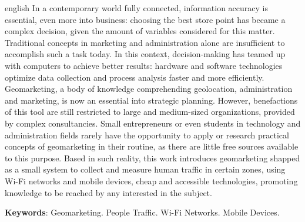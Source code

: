 \documentclass[
		12pt,				%
		openright,			%
		oneside,			%
		a4paper,			%
		chapter=TITLE,		%
		english,			%
		brazil				%
	]{abntex2}
\newif\iffinal
\begin{document}
	\begin{resumo}[Abstract]
	 	\begin{otherlanguage*}{english}
    In a contemporary world fully connected, information accuracy is essential, even more into business: choosing the best store point has became a complex decision, given the amount of variables considered for this matter. Traditional concepts in marketing and administration alone are insufficient to accomplish such a task today. In this context, decision-making has teamed up with computers to achieve better results: hardware and software technologies optimize data collection and process analysis faster and more efficiently. Geomarketing, a body of knowledge comprehending geolocation, administration and marketing, is now an essential into strategic planning. However, benefactions of this tool are still restricted to large and medium-sized organizations, provided by complex consultancies. Small entrepreneurs or even students in  technology and administration fields rarely have the opportunity to apply or research practical concepts of geomarketing in their routine, as there are little free sources available to this purpose. Based in such reality, this work introduces geomarketing shapped as a small system to collect and measure human traffic in certain zones, using Wi-Fi networks and mobile devices, cheap and accessible technologies, promoting knowledge to be reached by any interested in the subject.

		\textbf{Keywords}: Geomarketing. People Traffic. Wi-Fi Networks. Mobile Devices.

		\end{otherlanguage*}

	\end{resumo}

\fi


\iffinal
	\pdfbookmark[0]{\listfigurename}{lof}
	\listoffigures*
	\cleardoublepage
\fi


\iffinal
	\pdfbookmark[0]{\listtablename}{lot}
	\listoftables*
	\cleardoublepage
\fi
\end{document}
